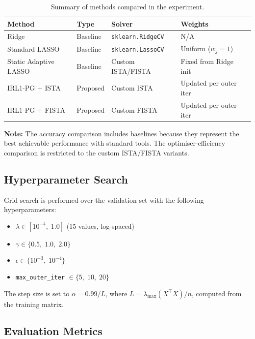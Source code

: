 \documentclass[12pt,a4paper]{article}
\begin{document}
\begin{table}[H]
\centering
\caption{Summary of methods compared in the experiment.}
\label{tab:methods}
\begin{tabularx}{\textwidth}{llllX}
\toprule
\textbf{Method} & \textbf{Type} & \textbf{Solver} & \textbf{Weights} \\
\midrule
Ridge                      & Baseline & \texttt{sklearn.RidgeCV}  & N/A \\
Standard LASSO             & Baseline & \texttt{sklearn.LassoCV}  & Uniform ($w_j = 1$) \\
Static Adaptive LASSO      & Baseline & Custom ISTA/FISTA         & Fixed from Ridge init \\
IRL1-PG + ISTA             & Proposed & Custom ISTA               & Updated per outer iter \\
IRL1-PG + FISTA            & Proposed & Custom FISTA              & Updated per outer iter \\
\bottomrule
\end{tabularx}
\end{table}

\noindent\textbf{Note:} The accuracy comparison includes baselines because they represent
the best achievable performance with standard tools. The optimiser-efficiency comparison
is restricted to the custom ISTA/FISTA variants.

\subsection{Hyperparameter Search}

Grid search is performed over the validation set with the following hyperparameters:
\begin{itemize}[noitemsep]
    \item $\lambda \in [10^{-4},\; 1.0]$ (15 values, log-spaced)
    \item $\gamma \in \{0.5,\; 1.0,\; 2.0\}$
    \item $\epsilon \in \{10^{-3},\; 10^{-4}\}$
    \item \texttt{max\_outer\_iter} $\in \{5,\; 10,\; 20\}$
\end{itemize}
The step size is set to $\alpha = 0.99/L$, where
$L = \lambda_{\max}(X^\top X)/n$, computed from the training matrix.

\subsection{Evaluation Metrics}
\end{document}
